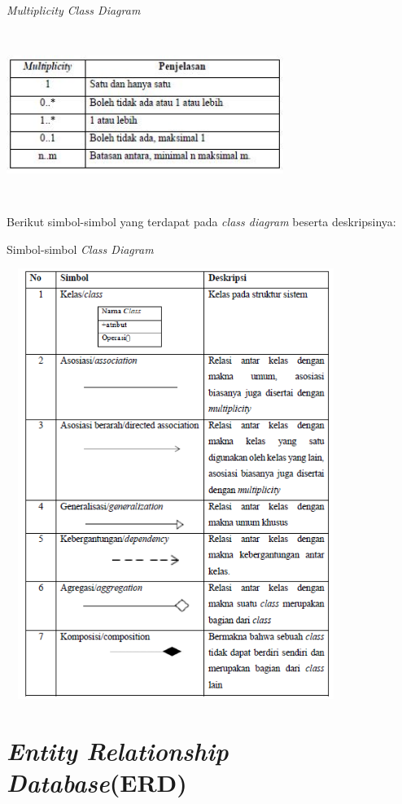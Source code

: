 \begin{table}[H]
	\centering
	\caption{\emph{Multiplicity Class Diagram}}
	\includegraphics[width=9cm,height=5.5cm]{gambar/multiplicity}
	\label{tabel_karaktermax2}
\end{table}
Berikut simbol-simbol yang terdapat pada\textit{ class diagram} beserta deskripsinya: 
\begin{table}[H]
	\centering
	\caption{Simbol-simbol \emph{Class Diagram} \cite{Rosa}}
	\includegraphics[width=11cm,height=14cm]{gambar/simbolclass}
	\label{tabel_karaktermax2}
\end{table}

\section{\emph{Entity Relationship Database}(ERD)}

